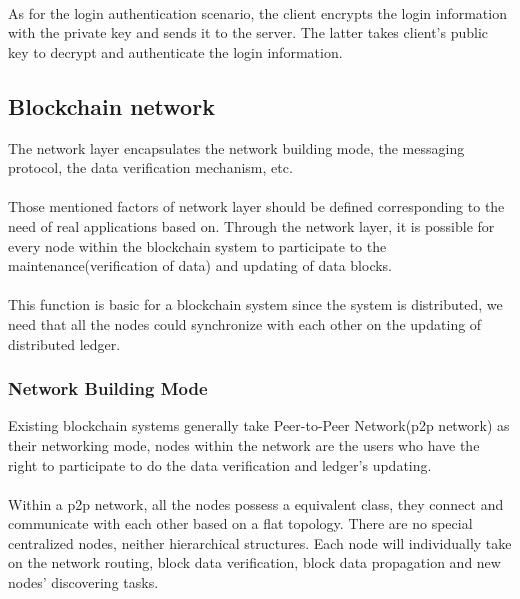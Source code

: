 \documentclass[doublespacing]{bmcart}
\begin{document}
\begin{CJK*}{UTF8}{gbsn}
\paragraph{} As for the login authentication scenario, the client encrypts the login information with the private key and sends it to the server. The latter takes client's public key to decrypt and authenticate the login information.
\subsection{Blockchain network}	
The network layer encapsulates the network building mode, the messaging protocol, the data verification mechanism, etc. 
\paragraph{} Those mentioned factors of network layer should be defined corresponding to the need of real applications based on. Through the network layer, it is possible for every node within the blockchain system to participate to the maintenance(verification of data) and updating of data blocks. 
\paragraph{} This function is basic for a blockchain system since the system is distributed, we need that all the nodes could synchronize with each other on the updating of distributed ledger.
\subsubsection*{Network Building Mode}
Existing blockchain systems generally take Peer-to-Peer Network(p2p network) as their networking mode, nodes within the network are the users who have the right to participate to do the data verification and ledger's updating.
\paragraph{} Within a p2p network, all the nodes possess a equivalent class, they connect and communicate with each other based on a flat topology. There are no special centralized nodes, neither hierarchical structures. Each node will individually take on the network routing, block data verification, block data propagation and new nodes' discovering tasks.

\end{CJK*}
\end{document}

